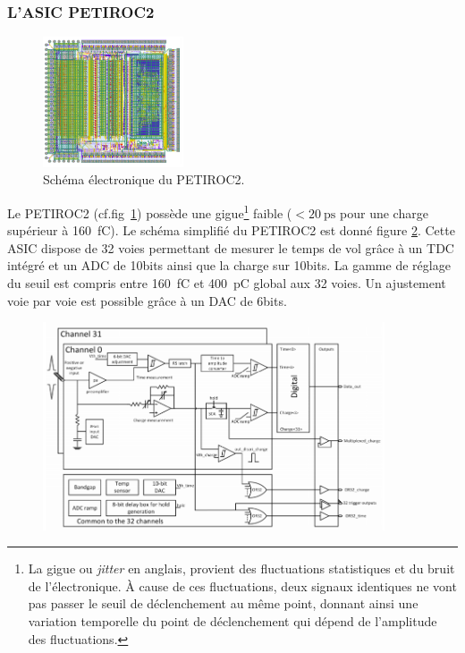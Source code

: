 \subsubsection{L'ASIC PETIROC2}
\begin{figure}
	\vspace*{-1cm}
	\centering
	\includegraphics[width=0.37\textwidth]{ELE/PETIROC.png}
	\caption{Schéma électronique du PETIROC2.}
	\label{PETIROC2}
\end{figure}
Le PETIROC2 (cf.fig~\ref{PETIROC2}) possède une gigue\footnote{La gigue ou \textit{jitter} en anglais, provient des fluctuations statistiques et du bruit de l'électronique. À cause de ces fluctuations, deux signaux identiques ne vont pas passer le seuil de déclenchement au même point, donnant ainsi une variation temporelle du point de déclenchement qui dépend de l'amplitude des fluctuations.} faible ($<\SI{20}{\pico\second}$ pour une charge supérieur à \SI{160}{\femto\coulomb}). Le schéma simplifié du PETIROC2 est donné figure \ref{SchemePETIROC}. Cette ASIC dispose de \num{32} voies permettant de mesurer le temps de vol grâce à un TDC intégré et un ADC de 10bits ainsi que la charge sur 10bits. La gamme de réglage du seuil est compris entre \SI{160}{\femto\coulomb} et \SI{400}{\pico\coulomb} global aux \num{32} voies. Un ajustement voie par voie est possible grâce à un DAC de 6bits. 

\begin{figure}[ht!]
	\centering
	\includegraphics[width=0.90\textwidth]{ELE/Scheme.png}
	\label{SchemePETIROC}
\end{figure}

